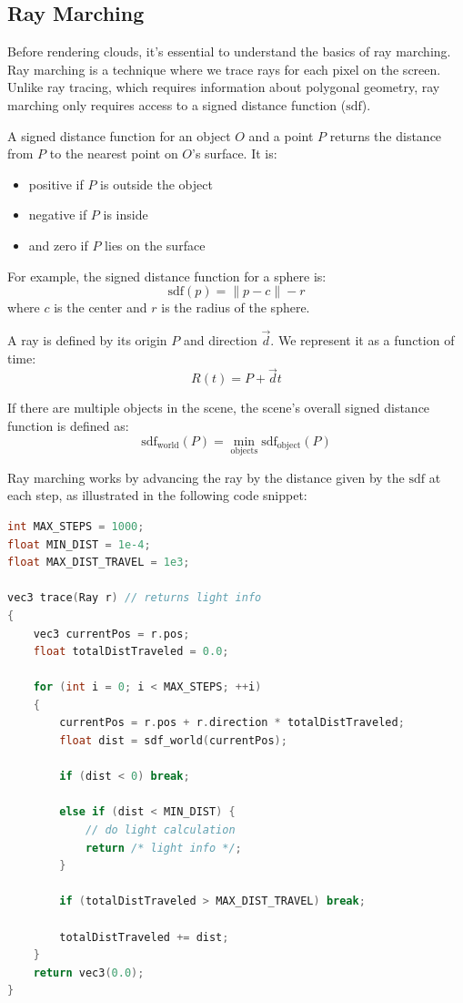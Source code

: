 \subsection{Ray Marching}

Before rendering clouds, it's essential to understand the basics of ray marching. Ray marching is a technique where we trace rays for each pixel on the screen. Unlike ray tracing, which requires information about polygonal geometry, ray marching only requires access to a signed distance function ($\text{sdf}$). 

A signed distance function for an object $O$ and a point $P$ returns the distance from $P$ to the nearest point on $O$'s surface. It is:
\begin{itemize}
\item{positive if $P$ is outside the object}
\item{negative if $P$ is inside}
\item{and zero if $P$ lies on the surface}
\end{itemize}

For example, the signed distance function for a sphere is:
\[
\text{sdf}(p) = \|p - c\| - r
\]
where $c$ is the center and $r$ is the radius of the sphere.

A ray is defined by its origin $P$ and direction $\vec{d}$. We represent it as a function of time:
\[
R(t) = P + \vec{d}t
\]

If there are multiple objects in the scene, the scene’s overall signed distance function is defined as:
\[
\text{sdf}_{\text{world}}(P) = \min_{\text{objects}} \text{sdf}_{\text{object}}(P)
\]

Ray marching works by advancing the ray by the distance given by the $\text{sdf}$ at each step, as illustrated in the following code snippet:

\begin{lstlisting}[language=C]
int MAX_STEPS = 1000;
float MIN_DIST = 1e-4;
float MAX_DIST_TRAVEL = 1e3;

vec3 trace(Ray r) // returns light info
{
    vec3 currentPos = r.pos;
    float totalDistTraveled = 0.0;

    for (int i = 0; i < MAX_STEPS; ++i)
    {
        currentPos = r.pos + r.direction * totalDistTraveled;
        float dist = sdf_world(currentPos);

        if (dist < 0) break;

        else if (dist < MIN_DIST) {
            // do light calculation
            return /* light info */;
        }

        if (totalDistTraveled > MAX_DIST_TRAVEL) break;

        totalDistTraveled += dist;
    }
    return vec3(0.0);
}
\end{lstlisting}

